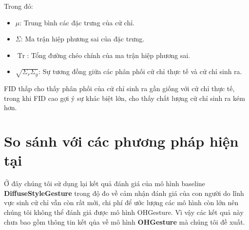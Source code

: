 Trong đó:

\begin{itemize}
	\item $\mu$: Trung bình các đặc trưng của cử chỉ.
	\item $\Sigma$: Ma trận hiệp phương sai của đặc trưng.
	\item $\operatorname{Tr}$: Tổng đường chéo chính của ma trận hiệp phương sai.
	\item $\sqrt{\Sigma_r \Sigma_g}$: Sự tương đồng giữa các phân phối cử chỉ thực tế và cử chỉ sinh ra.
\end{itemize}

FID thấp cho thấy phân phối của cử chỉ sinh ra gần giống với cử chỉ thực tế, trong khi FID cao gợi ý sự khác biệt lớn, cho thấy chất lượng cử chỉ sinh ra kém hơn.



%	







\section{So sánh với các phương pháp hiện tại}
\label{sec:result}


Ở đây chúng tôi sử dụng lại kết quả đánh giá của mô hình baseline \textbf{DiffuseStyleGesture} \cite{yang2023diffusestylegesture} trong độ đo về  cảm nhận đánh giá của con người do lĩnh vực sinh cử chỉ vẫn còn rất mới, chi phí để ước lượng các mô hình còn lớn nên chúng tôi không thể đánh giá được mô hình OHGesture. Vì vậy các kết quả này chưa bao gồm thông tin kết qủa về mô hình \textbf{OHGesture} mà chúng tôi đề xuất.

